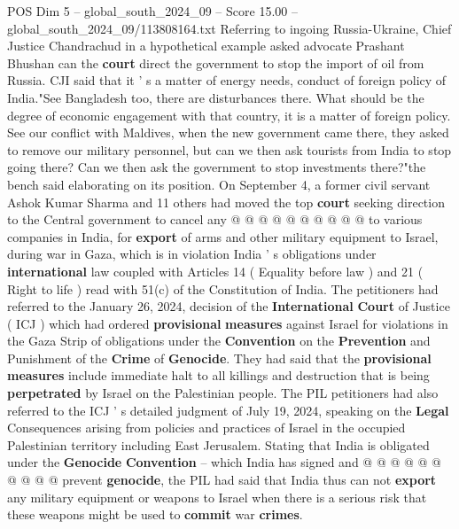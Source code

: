 \begin{textsample}{POS Dim 5 – global\_south\_2024\_09 – Score 15.00 – global\_south\_2024\_09/113808164.txt}
Referring to ingoing Russia-Ukraine, Chief Justice Chandrachud in a hypothetical example asked advocate Prashant Bhushan can the \textbf{court} direct the government to stop the import of oil from Russia.
CJI said that it ' s a matter of energy needs, conduct of foreign policy of India."See Bangladesh too, there are disturbances there.
What should be the degree of economic engagement with that country, it is a matter of foreign policy.
See our conflict with Maldives, when the new government came there, they asked to remove our military personnel, but can we then ask tourists from India to stop going there?
Can we then ask the government to stop investments there?"the bench said elaborating on its position.
On September 4, a former civil servant Ashok Kumar Sharma and 11 others had moved the top \textbf{court} seeking direction to the Central government to cancel any @ @ @ @ @ @ @ @ @ @ to various companies in India, for \textbf{export} of arms and other military equipment to Israel, during war in Gaza, which is in violation India ' s obligations under \textbf{international} law coupled with Articles 14 ( Equality before law ) and 21 ( Right to life ) read with 51(c) of the Constitution of India.
The petitioners had referred to the January 26, 2024, decision of the \textbf{International} \textbf{Court} of Justice ( ICJ ) which had ordered \textbf{provisional} \textbf{measures} against Israel for violations in the Gaza Strip of obligations under the \textbf{Convention} on the \textbf{Prevention} and Punishment of the \textbf{Crime} of \textbf{Genocide}.
They had said that the \textbf{provisional} \textbf{measures} include immediate halt to all killings and destruction that is being \textbf{perpetrated} by Israel on the Palestinian people.
The PIL petitioners had also referred to the ICJ ' s detailed judgment of July 19, 2024, speaking on the \textbf{Legal} Consequences arising from policies and practices of Israel in the occupied Palestinian territory including East Jerusalem.
Stating that India is obligated under the \textbf{Genocide} \textbf{Convention} -- which India has signed and @ @ @ @ @ @ @ @ @ @ prevent \textbf{genocide}, the PIL had said that India thus can not \textbf{export} any military equipment or weapons to Israel when there is a serious risk that these weapons might be used to \textbf{commit} war \textbf{crimes}.

\end{textsample}
